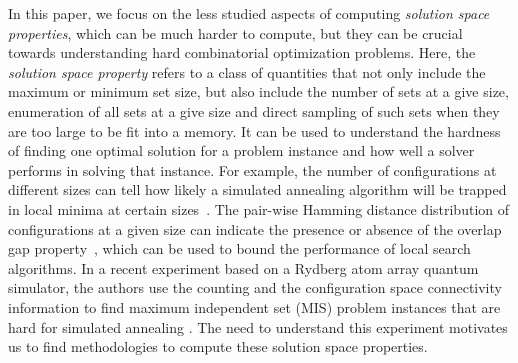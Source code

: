 \documentclass[onefignum, onetabnum]{siamart190516}
\newcommand{\<}{\langle}
\renewcommand{\>}{\rangle}
\newcommand{\blue}[1]{[{\bf  \color{blue}{JG: #1}}]}
\newcommand{\purple}[1]{[{\bf  \color{purple}{MC: #1}}]}
\newcounter{example}
\begin{document}
In this paper, we focus on the less studied aspects of computing \textit{solution space properties}, which can be much harder to compute, %
but they can be crucial towards understanding hard combinatorial optimization problems. Here, the \textit{solution space property} refers to a class of quantities that not only include the maximum or minimum set size,
but also include the number of sets at a give size, enumeration of all sets at a give size and direct sampling of such sets when they are too large to be fit into a memory.
It can be used to understand the hardness of finding one optimal solution for a problem instance and how well a solver performs in solving that instance. For example, the number of configurations at different sizes can tell how likely a simulated annealing algorithm will be trapped in local minima at certain sizes~\cite{Xu2018}.
The pair-wise Hamming distance distribution of configurations at a given size can indicate %
the presence or absence of the overlap gap property~\cite{Gamarnik2013, Gamarnik2019}, which can be used to bound the performance of local search algorithms.
In a recent experiment based on a Rydberg atom array quantum simulator, the authors use the counting and the configuration space connectivity information to find maximum independent set (MIS) problem instances that are hard for simulated annealing \cite{Ebadi2022}.
The need to understand this experiment motivates us to find methodologies to compute these solution space properties.
\end{document}
